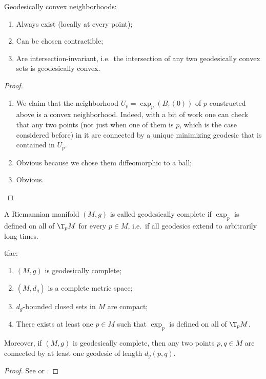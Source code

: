 \begin{thm}\label{geodesically convex nbhds thm}
    Geodesically convex neighborhoods:
    \begin{enumerate}
        \item Always exist (locally at every point);
        \item Can be chosen contractible;
        \item Are intersection-invariant, i.e.\ the intersection of any two geodesically convex sets is geodesically convex.
    \end{enumerate}
\end{thm}
\begin{proof}
    \begin{enumerate}
        \item We claim that the neighborhood $U_p=\exp_p(B_\varepsilon(0))$ of $p$ constructed above is a convex neighborhood. Indeed, with a bit of work one can check that any two points (not just when one of them is $p$, which is the case considered before) in it are connected by a unique minimizing geodesic that is contained in $U_p$.
        \item Obvious because we chose them diffeomorphic to a ball;
        \item Obvious.
    \end{enumerate}
\end{proof}


\begin{defn}
    A Riemannian manifold $(M,g)$ is called geodesically complete if $\exp_p$ is defined on all of $\T_pM$ for every $p\in M$, i.e.\ if all geodesics extend to arbitrarily long times.
\end{defn}

\begin{thm}
    \gls{tfae}:
    \begin{enumerate}
        \item $(M,g)$ is geodesically complete;
        \item $(M,d_g)$ is a complete metric space;
        \item $d_g$-bounded closed sets in $M$ are compact;
        \item There exists at least one $p\in M$ such that $\exp_p$ is defined on all of $\T_p M$.
    \end{enumerate}
    Moreover, if $(M,g)$ is geodesically complete, then any two points $p,q\in M$ are connected by at least one geodesic of length $d_g(p,q)$.
\end{thm}
\begin{proof}
    See \cite[Thm. 1.7.1]{Jost} or \cite[Thm. 10.9]{Milnor}.
\end{proof}



